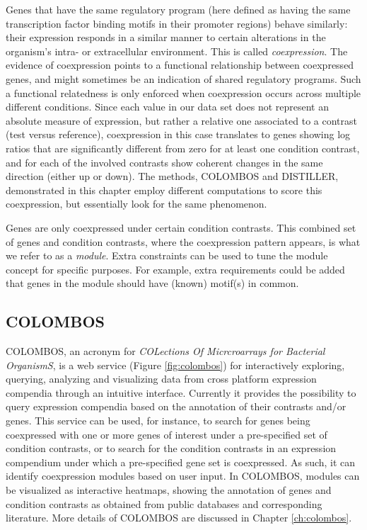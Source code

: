 Genes that have the same regulatory program (here defined as having the same transcription factor binding motifs in their promoter regions) behave similarly: their expression responds in a similar manner to certain alterations in the organism's intra- or extracellular environment. This is called \textit{coexpression}. The evidence of coexpression points to a functional relationship between coexpressed genes, and might sometimes be an indication of shared regulatory programs.  Such a functional relatedness is only enforced when coexpression occurs across multiple different conditions. Since each value in our data set does not represent an absolute measure of expression, but rather a relative one associated to a contrast (test versus reference), coexpression in this case translates to genes showing log ratios that are significantly different from zero for at least one condition contrast, and for each of the involved contrasts show coherent changes in the same direction (either up or down). The methods, COLOMBOS and DISTILLER, demonstrated in this chapter employ different computations to score this coexpression, but essentially look for the same phenomenon.

Genes are only coexpressed under certain condition contrasts. This combined set of genes and condition contrasts, where the coexpression pattern appears, is what we refer to as a \textit{module}. Extra constraints can be used to tune the module concept for specific purposes. For example, extra requirements could be added that genes in the module should have (known) motif(s) in common.


\subsection{COLOMBOS}

COLOMBOS, an acronym for \textit{COLections Of Micrcroarrays for Bacterial OrganismS}, is a web service \cite{COLOMBOS, Meysman2014} (Figure \ref{fig:colombos}) for interactively exploring, querying, analyzing and visualizing data from cross platform expression compendia through an intuitive interface. Currently it provides the possibility to query expression compendia based on the annotation of their contrasts and/or genes. This service can be used, for instance, to search for genes being coexpressed with one or more genes of interest under a pre-specified set of condition contrasts, or to search for the condition contrasts in an expression compendium under which a pre-specified gene set is coexpressed. As such, it can identify coexpression modules based on user input. In COLOMBOS, modules can be visualized as interactive heatmaps, showing the annotation of genes and condition contrasts as obtained from public databases and corresponding literature. More details of COLOMBOS are discussed in Chapter \ref{ch:colombos}.

